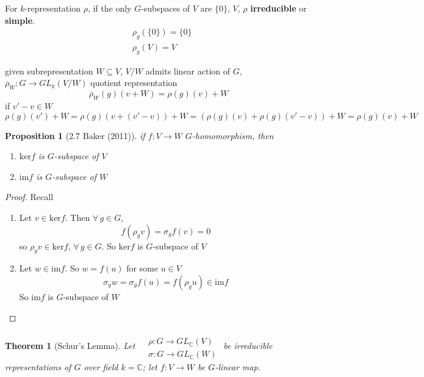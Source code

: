 \documentclass[10pt]{amsart}
\newtheorem{theorem}{Theorem}
\newtheorem{proposition}{Proposition}
\begin{document}
\begin{multicols*}{2}
For $k$-representation $\rho$, if the only $G$-subspaces of $V$ are $\lbrace 0 \rbrace$, $V$, $\rho$ \textbf{irreducible} or \textbf{simple}.  
\[
\begin{aligned}
& \rho_g(\lbrace 0 \rbrace) = \lbrace 0 \rbrace \\ 
&  \rho_g(V) = V
\end{aligned}
\]


given subrepresentation $W \subseteq V$, $V/W$ admits linear action of $G$, $\overline{\rho}_W : G \to GL_k(V/W)$ quotient representation 
\[
\overline{\rho}_W(g)(v+W) = \rho(g)(v) + W
\]
if $v'-v \in W$
\[
\rho(g)(v') + W = \rho(g)(v+(v'-v))+W = (\rho(g)(v) + \rho(g)(v'-v) ) + W = \rho(g)(v) + W
\]
\begin{proposition}[2.7 Baker (2011)\cite{ABaker2011}] \label{Prop:Baker2.7}
	if $f:V \to W$ $G$-homomorphism, then
	\begin{enumerate}
		\item[(a)] $\text{ker}{f}$ is $G$-subspace of $V$ 
		\item[(b)] $\text{im}{f}$ is $G$-subspace of $W$
	\end{enumerate}
\end{proposition}

\begin{proof}
	Recall 
	
	\begin{enumerate}
		\item[(a)] Let $v\in \text{ker}{f}$.  Then $\forall \, g \in G$, 
		\[
		f(\rho_g v) = \sigma_g f(v) = 0 
		\]
		so $\rho_g v \in \text{ker}{f}$, $\forall \, g \in G$.  So $\text{ker}{f}$ is $G$-subspace of $V$
		\item[(b)] Let $w\in \text{im}{f}$.  So $w = f(u)$ for some $u \in V$ 
		\[
		\sigma_g w = \sigma_g f(u) = f(\rho_gu) \in \text{im}f
		\]
		So $\text{im}{f}$ is $G$-subspace of $W$
	\end{enumerate}
\end{proof}

\begin{theorem}[Schur's Lemma]
	Let $\begin{aligned} & \quad \\
	& \rho : G \to GL_{\mathbb{C}}(V) \\
	& \sigma : G \to GL_{\mathbb{C}}(W) \end{aligned}$ be irreducible representations of $G$ over field $k= \mathbb{C}$; let $f:V \to W$ be $G$-linear map.  
	

\end{theorem}
\end{multicols*}
\end{document}
